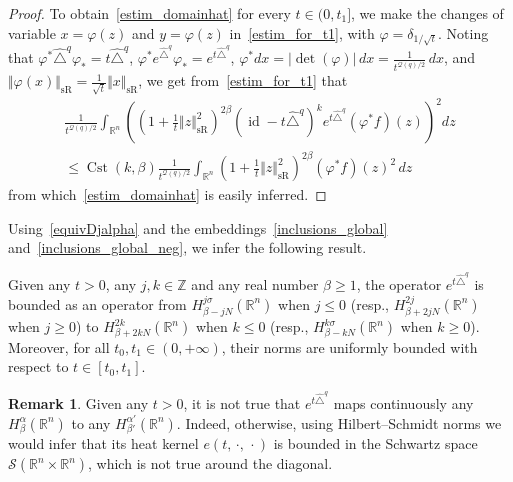\documentclass[10pt]{amsart}
\theoremstyle{definition}\newtheorem{defi}[theo]{Definition}\newtheorem{rema}[theo]{Remark}\newtheorem{exam}[theo]{Example}\newtheorem{exem}[theo]{Example}\newtheorem{nota}[theo]{Notation}
\newcommand*\R{\mathbb{R}}
\newcommand*\Z{\mathbb{Z}}
\newcommand{\calQ}{\mathcal{Q}}
\newcommand{\calS}{\mathcal{S}}
\DeclareMathOperator{\Cst}{Cst}
\DeclareMathOperator{\id}{id}
\DeclareMathOperator{\sR}{sR}
\renewcommand{\geq}{\geqslant}
\renewcommand{\leq}{\leqslant}
\begin{document}
\begin{proof}
To obtain~\eqref{estim_domainhat} for every $t\in(0,t_1]$, we make the changes of variable $x=\varphi(z)$ and $y=\varphi(z)$ in~\eqref{estim_for_t1}, with $\varphi=\delta_{1/\sqrt{t}}$. Noting that $\varphi^* \widehat{\triangle}^q \varphi_* = t \widehat{\triangle}^q$, $\varphi^* e^{\widehat{\triangle}^q} \varphi_* = e^{t \widehat{\triangle}^q}$, $\varphi^*dx=\vert\det(\varphi)\vert\, dx=\frac{1}{t^{\calQ(q)/2}}\, dx$, and $\Vert\varphi(x)\Vert_{\sR} = \frac{1}{\sqrt{t}} \Vert x\Vert_{\sR}$, we get from~\eqref{estim_for_t1} that
\begin{multline*}
\frac{1}{t^{\calQ(q)/2}}\int_{\R^n} \left(\left(1+ \frac{1}{t} \Vert z\Vert_{\sR}^2 \right)^{2\beta} \left(\id - t\widehat{\triangle}^q\right)^k e^{t\widehat{\triangle}^q} (\varphi^*f)(z) \right)^2 dz \\
\leq \Cst(k,\beta) \frac{1}{t^{\calQ(q)/2}} \int_{\R^n} \left(1+ \frac{1}{t} \Vert z\Vert_{\sR}^2 \right)^{2\beta} (\varphi^*f)(z)^2\, dz
\end{multline*}
from which~\eqref{estim_domainhat} is easily inferred.
\end{proof}



Using~\eqref{equivDjalpha} and the embeddings~\eqref{inclusions_global} and~\eqref{inclusions_global_neg}, we infer the following result.

\begin{coro}
Given any $t>0$, any $j,k\in\Z$ and any real number $\beta\geq 1$, the operator $e^{t\widehat{\triangle}^q}$ is bounded as an operator from $H^{j\sigma}_{\beta-jN}(\R^n)$ when $j\leq 0$ (resp., $H^{2j}_{\beta+2jN}(\R^n)$ when $j\geq 0$) to $H^{2k}_{\beta+2kN}(\R^n)$ when $k\leq 0$ (resp., $H^{k\sigma}_{\beta-kN}(\R^n)$ when $k\geq 0$). Moreover, for all $t_0,t_1\in(0,+\infty)$, their norms are uniformly bounded with respect to $t\in[t_0,t_1]$.
\end{coro}



\begin{rema}
Given any $t>0$, it is not true that $e^{t\widehat{\triangle}^q}$ maps continuously any $H^\alpha_\beta(\R^n)$ to any $H^{\alpha'}_{\beta'}(\R^n)$. Indeed, otherwise, using Hilbert--Schmidt norms we would infer that its heat kernel $e(t,\,\cdot,\,\cdot)$ is bounded in the Schwartz space $\calS(\R^n\times\R^n)$, which is not true around the diagonal.
\end{rema}

\end{document}
